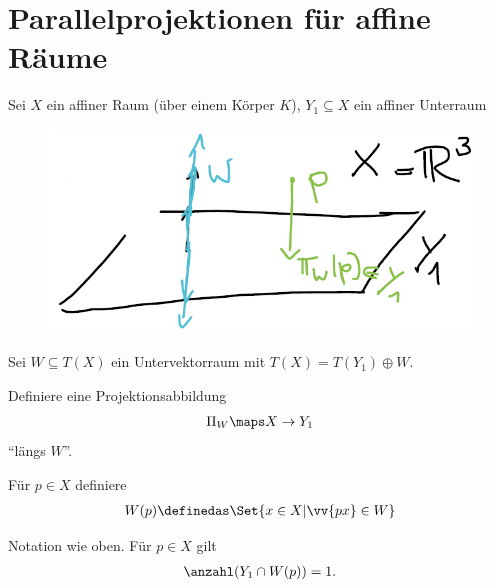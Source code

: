 \section*{Parallelprojektionen für affine Räume}
Sei \( X \) ein affiner Raum (über einem Körper \( K \)), \( Y_1\subseteq X \) ein affiner Unterraum
\begin{beispiel*}
    \begin{figure}[H]
        \centering
        \includegraphics[width=0.5\linewidth]{figures/affine_parallelprojektion_r_3}
        \label{fig:affine_parallelprojektion_r_3}
    \end{figure}
    
\end{beispiel*}
Sei \( W\subseteq T(X) \) ein Untervektorraum mit \( T(X)=T(Y_1)\oplus W \).
\begin{ziel*}
    Definiere eine Projektionsabbildung
    \begin{align*}
        \Pi_W\maps X\to Y_1
    \end{align*}
    \enquote{längs \( W \)}.
\end{ziel*}
Für \( p\in X \) definiere
\begin{align*}
    W(p)\definedas\Set{x\in X| \vv{px}\in W}
\end{align*}
\begin{lemma}
    Notation wie oben.
    Für \( p\in X \) gilt
    \begin{align*}
        \anzahl(Y_1\cap W(p))=1.
    \end{align*}
\end{lemma}
